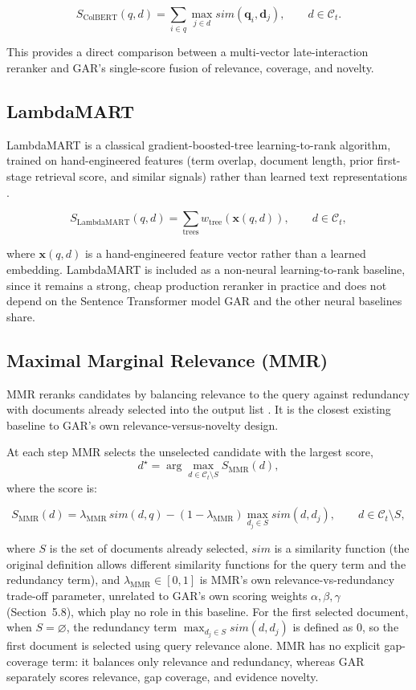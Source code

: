 \documentclass[11pt,a4paper]{article}
\begin{document}
\[
S_{\mathrm{ColBERT}}(q,d)
=
\sum_{i\in q}
\max_{j\in d}
sim(\mathbf q_i,\mathbf d_j),
\qquad d\in\mathcal{C}_t.
\]

This provides a direct comparison between a multi-vector late-interaction reranker and GAR's single-score fusion of relevance, coverage, and novelty.

\subsection{LambdaMART}

LambdaMART is a classical gradient-boosted-tree learning-to-rank algorithm, trained on hand-engineered features (term overlap, document length, prior first-stage retrieval score, and similar signals) rather than learned text representations \citep{burges-2010-lambdamart}.

\[
S_{\mathrm{LambdaMART}}(q,d)
=
\sum_{\text{trees}}
w_{\text{tree}}(\mathbf{x}(q,d)),
\qquad d\in\mathcal{C}_t,
\]

where $\mathbf{x}(q,d)$ is a hand-engineered feature vector rather than a learned embedding. LambdaMART is included as a non-neural learning-to-rank baseline, since it remains a strong, cheap production reranker in practice and does not depend on the Sentence Transformer model GAR and the other neural baselines share.

\subsection{Maximal Marginal Relevance (MMR)}

MMR reranks candidates by balancing relevance to the query against redundancy with documents already selected into the output list \citep{carbonell-goldstein-1998-mmr}. It is the closest existing baseline to GAR's own relevance-versus-novelty design.

At each step MMR selects the unselected candidate with the largest score,
\[
d^\star=\arg\max_{d\in\mathcal{C}_t\setminus S}S_{\mathrm{MMR}}(d),
\]
where the score is:

\[
S_{\mathrm{MMR}}(d)
=
\lambda_{\mathrm{MMR}}\, sim(d,q)
-
(1-\lambda_{\mathrm{MMR}})\max_{d_j\in S} sim(d,d_j),
\qquad d\in\mathcal{C}_t\setminus S,
\]

where $S$ is the set of documents already selected, $sim$ is a similarity function (the original definition allows different similarity functions for the query term and the redundancy term), and $\lambda_{\mathrm{MMR}}\in[0,1]$ is MMR's own relevance-vs-redundancy trade-off parameter, unrelated to GAR's own scoring weights $\alpha,\beta,\gamma$ (Section~5.8), which play no role in this baseline. For the first selected document, when $S=\varnothing$, the redundancy term $\max_{d_j\in S}sim(d,d_j)$ is defined as $0$, so the first document is selected using query relevance alone. MMR has no explicit gap-coverage term: it balances only relevance and redundancy, whereas GAR separately scores relevance, gap coverage, and evidence novelty.
\end{document}
